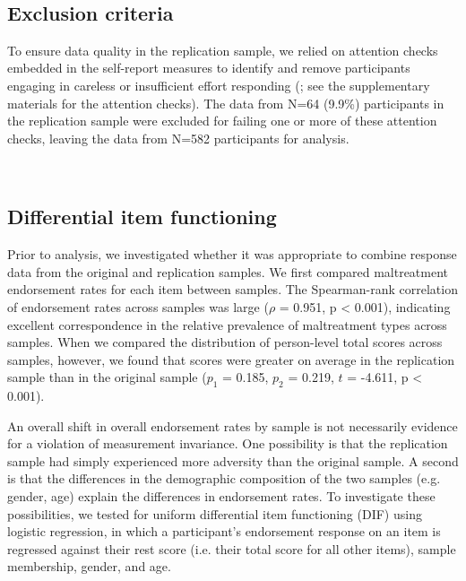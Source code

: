 \documentclass[letterpaper,man,natbib,noextraspace,floatsintext,longtable]{apa6}
\begin{document}
{\begin{spacing}{0.2} \hfill \\ \end{spacing}}  \subsection{Exclusion criteria}

To ensure data quality in the replication sample, we relied on attention checks embedded in the self-report measures to identify and remove participants engaging in careless or insufficient effort responding (\citealt{zorowitz2021inattentive}; see the supplementary materials for the attention checks). The data from N=64 (9.9\%) participants in the replication sample were excluded for failing one or more of these attention checks, leaving the data from N=582 participants for analysis.

{\begin{spacing}{0.2} \hfill \\ \end{spacing}} \subsection{Differential item functioning}

Prior to analysis, we investigated whether it was appropriate to combine response data from the original and replication samples. We first compared maltreatment endorsement rates for each item between samples. The Spearman-rank correlation of endorsement rates across samples was large ($\rho$ = 0.951, p < 0.001), indicating excellent correspondence in the relative prevalence of maltreatment types across samples. When we compared the distribution of person-level total scores across samples, however, we found that scores were greater on average in the replication sample than in the original sample ($p_1$ = 0.185, $p_2$ = 0.219, $t$ = -4.611, p < 0.001). 

An overall shift in overall endorsement rates by sample is not necessarily evidence for a violation of measurement invariance. One possibility is that the replication sample had simply experienced more adversity than the original sample. A second is that the differences in the demographic composition of the two samples (e.g. gender, age) explain the differences in endorsement rates. To investigate these possibilities, we tested for uniform differential item functioning (DIF) using logistic regression, in which a participant's endorsement response on an item is regressed against their rest score (i.e. their total score for all other items), sample membership, gender, and age.
\end{document}
